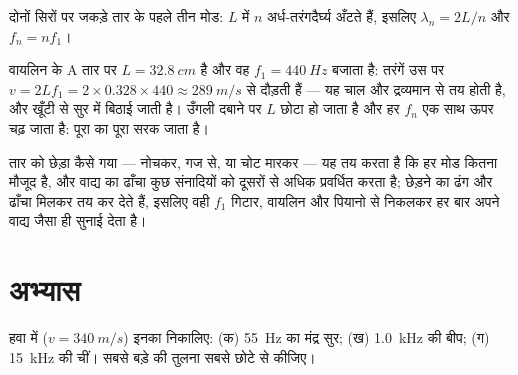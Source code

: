 \begin{omfigure}

{\small दोनों सिरों पर जकड़े तार के पहले तीन मोड: $L$ में $n$
अर्ध-तरंगदैर्घ्य अँटते हैं, इसलिए $\lambda_n = 2L/n$ और $f_n = nf_1$।}
\end{omfigure}

\begin{example}[वायलिन का A तार]\label{ex:g12:sound-acoustics:violin}
वायलिन के A तार पर $L = \qty{32.8}{cm}$ है और वह $f_1 = \qty{440}{Hz}$ बजाता है:
तरंगें उस पर $v = 2Lf_1 = 2 \times 0.328 \times 440 \approx \qty{289}{m/s}$ से दौड़ती हैं --- यह चाल  और
द्रव्यमान से तय होती है, और खूँटी से सुर में बिठाई जाती है। उँगली दबाने पर
$L$ छोटा हो जाता है और हर $f_n$ एक साथ ऊपर चढ़ जाता है:
 पूरा का पूरा सरक जाता है।
\end{example}

\begin{remark}\label{rem:g12:sound-acoustics:instruments}
तार को छेड़ा कैसे गया --- नोचकर, गज से, या चोट मारकर --- यह तय करता है कि हर
मोड कितना मौजूद है, और वाद्य का ढाँचा कुछ संनादियों को दूसरों से
अधिक प्रवर्धित करता है; छेड़ने का ढंग और ढाँचा मिलकर  तय कर
देते हैं, इसलिए वही $f_1$ गिटार, वायलिन और पियानो से निकलकर हर बार अपने
वाद्य जैसा ही सुनाई देता है।
\end{remark}

\section{अभ्यास}

\begin{exercise}[$\star$]\label{exo:g12:sound-acoustics:1}
हवा में ($v = \qty{340}{m/s}$) इनका  निकालिए: (क) \qty{55}{Hz} का मंद्र
सुर; (ख) \qty{1.0}{kHz} की बीप; (ग) \qty{15}{kHz} की चीं। सबसे बड़े की तुलना सबसे छोटे से
कीजिए।
\end{exercise}

